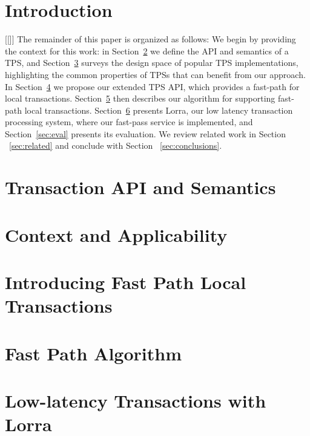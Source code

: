 \documentclass[preprint]{sigplanconf-eurosys}
\newcommand{\inred}[1]{{\color{red}{#1}}}
\newcommand{\Idit}[1]{[[\inred{Idit: #1}]]}
\newcommand{\sys}{Lorra}
\begin{document}

\section{Introduction} \label{sec:intro}


\Idit{The roadmap below is not essential; maybe replace with summary of contributions.}
The remainder of this paper is organized as follows:
We begin by providing the context for this work:   in Section~\ref{sec:api} we define the  API and semantics of a TPS, 
and    Section~\ref{sec:context} surveys  the design space of popular TPS implementations, 
highlighting the common properties of TPSs that can benefit from our approach. 
In Section~\ref{sec:new-api} we propose our extended TPS API, which provides a fast-path for local transactions. 
Section~\ref{sec:alg} then describes our algorithm for supporting fast-path local transactions.  
Section~\ref{sec:impl} presents \sys, our low latency transaction processing system, where our fast-pass service is implemented, 
and Section~\ref{sec:eval} presents its evaluation. 
We review related work in Section ~\ref{sec:related} and conclude with Section ~\ref{sec:conclusions}.

\section{Transaction API and Semantics} \label{sec:api}


\section{Context and Applicability} \label{sec:context}


\section{Introducing Fast Path Local Transactions} \label{sec:new-api}


\section{Fast Path  Algorithm} \label{sec:alg}


\section{Low-latency Transactions with \sys} \label{sec:impl}
\end{document}
